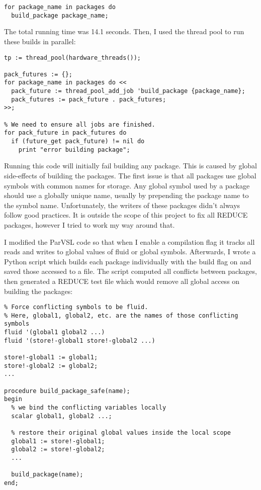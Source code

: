 \begin{verbatim}
for package_name in packages do
  build_package package_name;
\end{verbatim}

The total running time was 14.1 seconds. Then, I used the thread pool
to run these builds in parallel:

\begin{verbatim}
tp := thread_pool(hardware_threads());

pack_futures := {};
for package_name in packages do <<
  pack_future := thread_pool_add_job 'build_package {package_name};
  pack_futures := pack_future . pack_futures;
>>;

% We need to ensure all jobs are finished.
for pack_future in pack_futures do
  if (future_get pack_future) != nil do
    print "error building package";
\end{verbatim}

Running this code will initially fail building any package. This is caused
by global side-effects of building the packages. The first issue is that all
packages use global symbols with common names for storage. Any global
symbol used by a package should use a globally unique name, usually by prepending
the package name to the symbol name. Unfortunately, the writers of these packages
didn't always follow good practices. It is outside the scope of this project to
fix all REDUCE packages, however I tried to work my way around that.

I modified the ParVSL code so that when I enable a compilation flag it tracks all
reads and writes to global values of fluid or global symbols. Afterwards, I wrote a Python
script which builds each package individually with the build flag on and saved those
accessed to a file. The script computed all conflicts between packages,
then generated a REDUCE test file which would remove all global access on building the packages:

\begin{verbatim}
% Force conflicting symbols to be fluid.
% Here, global1, global2, etc. are the names of those conflicting symbols
fluid '(global1 global2 ...)
fluid '(store!-global1 store!-global2 ...)

store!-global1 := global1;
store!-global2 := global2;
...

procedure build_package_safe(name);
begin
  % we bind the conflicting variables locally
  scalar global1, global2 ...;

  % restore their original global values inside the local scope
  global1 := store!-global1;
  global2 := store!-global2;
  ...

  build_package(name);
end;
\end{verbatim}

